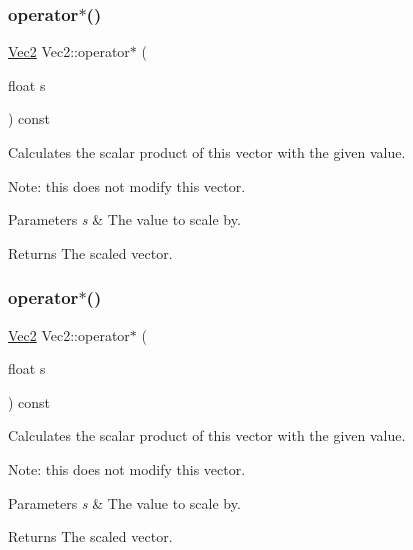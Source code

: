 \subsubsection{\texorpdfstring{operator$\ast$()}{operator*()}\hspace{0.1cm}{\footnotesize\ttfamily [1/2]}}
{\footnotesize\ttfamily \hyperlink{classVec2}{Vec2} Vec2\+::operator$\ast$ (\begin{DoxyParamCaption}\item[{float}]{s }\end{DoxyParamCaption}) const\hspace{0.3cm}{\ttfamily [inline]}}

Calculates the scalar product of this vector with the given value.

Note\+: this does not modify this vector.


\begin{DoxyParams}{Parameters}
{\em s} & The value to scale by. \\
\hline
\end{DoxyParams}
\begin{DoxyReturn}{Returns}
The scaled vector. 
\end{DoxyReturn}
\mbox{\label{classVec2_aac30b50a35381a11b76b89ea19dc7f12}} 
\subsubsection{\texorpdfstring{operator$\ast$()}{operator*()}\hspace{0.1cm}{\footnotesize\ttfamily [2/2]}}
{\footnotesize\ttfamily \hyperlink{classVec2}{Vec2} Vec2\+::operator$\ast$ (\begin{DoxyParamCaption}\item[{float}]{s }\end{DoxyParamCaption}) const\hspace{0.3cm}{\ttfamily [inline]}}

Calculates the scalar product of this vector with the given value.

Note\+: this does not modify this vector.


\begin{DoxyParams}{Parameters}
{\em s} & The value to scale by. \\
\hline
\end{DoxyParams}
\begin{DoxyReturn}{Returns}
The scaled vector. 
\end{DoxyReturn}
\mbox{\label{classVec2_a579a80f68497014e300b45b9824998a1}} 
